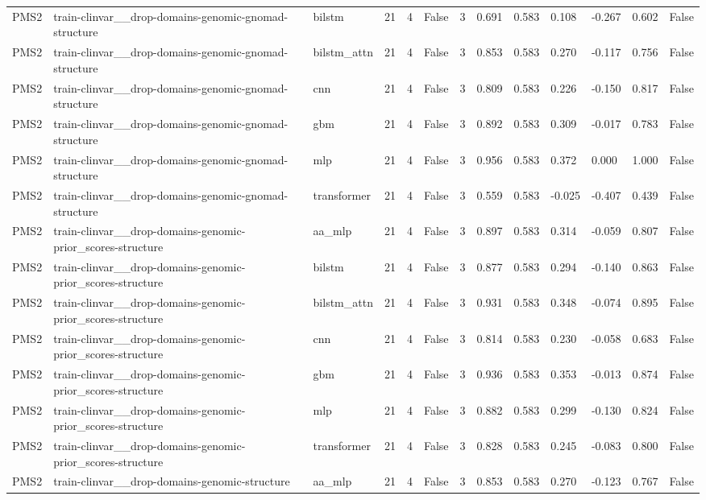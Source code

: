 \begin{table}[t]
\begin{tabular}{lllllllllllll}
PMS2 & train-clinvar\_\_drop-domains-genomic-gnomad-structure & bilstm & 21 & 4 & False & 3 & 0.691 & 0.583 & 0.108 & -0.267 & 0.602 & False \\
PMS2 & train-clinvar\_\_drop-domains-genomic-gnomad-structure & bilstm\_attn & 21 & 4 & False & 3 & 0.853 & 0.583 & 0.270 & -0.117 & 0.756 & False \\
PMS2 & train-clinvar\_\_drop-domains-genomic-gnomad-structure & cnn & 21 & 4 & False & 3 & 0.809 & 0.583 & 0.226 & -0.150 & 0.817 & False \\
PMS2 & train-clinvar\_\_drop-domains-genomic-gnomad-structure & gbm & 21 & 4 & False & 3 & 0.892 & 0.583 & 0.309 & -0.017 & 0.783 & False \\
PMS2 & train-clinvar\_\_drop-domains-genomic-gnomad-structure & mlp & 21 & 4 & False & 3 & 0.956 & 0.583 & 0.372 & 0.000 & 1.000 & False \\
PMS2 & train-clinvar\_\_drop-domains-genomic-gnomad-structure & transformer & 21 & 4 & False & 3 & 0.559 & 0.583 & -0.025 & -0.407 & 0.439 & False \\
PMS2 & train-clinvar\_\_drop-domains-genomic-prior\_scores-structure & aa\_mlp & 21 & 4 & False & 3 & 0.897 & 0.583 & 0.314 & -0.059 & 0.807 & False \\
PMS2 & train-clinvar\_\_drop-domains-genomic-prior\_scores-structure & bilstm & 21 & 4 & False & 3 & 0.877 & 0.583 & 0.294 & -0.140 & 0.863 & False \\
PMS2 & train-clinvar\_\_drop-domains-genomic-prior\_scores-structure & bilstm\_attn & 21 & 4 & False & 3 & 0.931 & 0.583 & 0.348 & -0.074 & 0.895 & False \\
PMS2 & train-clinvar\_\_drop-domains-genomic-prior\_scores-structure & cnn & 21 & 4 & False & 3 & 0.814 & 0.583 & 0.230 & -0.058 & 0.683 & False \\
PMS2 & train-clinvar\_\_drop-domains-genomic-prior\_scores-structure & gbm & 21 & 4 & False & 3 & 0.936 & 0.583 & 0.353 & -0.013 & 0.874 & False \\
PMS2 & train-clinvar\_\_drop-domains-genomic-prior\_scores-structure & mlp & 21 & 4 & False & 3 & 0.882 & 0.583 & 0.299 & -0.130 & 0.824 & False \\
PMS2 & train-clinvar\_\_drop-domains-genomic-prior\_scores-structure & transformer & 21 & 4 & False & 3 & 0.828 & 0.583 & 0.245 & -0.083 & 0.800 & False \\
PMS2 & train-clinvar\_\_drop-domains-genomic-structure & aa\_mlp & 21 & 4 & False & 3 & 0.853 & 0.583 & 0.270 & -0.123 & 0.767 & False \\

\end{tabular}
\end{table}
